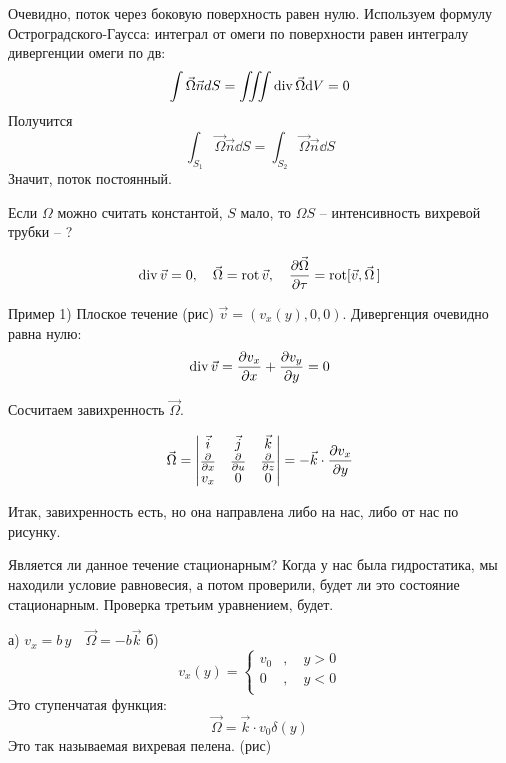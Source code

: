 Очевидно, поток через боковую поверхность равен нулю. Используем формулу Остроградского-Гаусса: интеграл от омеги по поверхности равен интегралу дивергенции омеги по дв:
\begin{equation}
	\int \vec \Omega \vec{n} dS=\iiint \operatorname{div}\vec \Omega \dd V=0
\end{equation}
Получится
\begin{equation}
	\int_{S_1} \vec \Omega \vec{n} \dd S=\int_{S_2} \vec \Omega \vec{n} \dd S
\end{equation}
Значит, поток постоянный.

Если $\Omega$ можно считать константой, $S$ мало, то $\Omega S$ -- интенсивность вихревой трубки -- ?

\begin{equation}
	\operatorname{div} \vec{v}=0, \quad
	\vec \Omega=\operatorname{rot}\vec{v}, \quad
	\pdv{\vec \Omega}{\tau}=\operatorname{rot}[\vec{v},\vec{\Omega}\,]
\end{equation}

Пример 1) Плоское течение (рис) $\vec{v}=(v_x(y),0,0)$. Дивергенция очевидно равна нулю:
\begin{equation}
	\operatorname{div}\vec{v}=\pdv{v_x}{x}+\pdv{v_y}{y}=0
\end{equation}

Сосчитаем завихренность $\vec\Omega$.

\begin{equation}
	\vec{\Omega}=\mqty| %
		\vec{i}&\vec{j}&\vec{k}\\
		\pdv{x}&\pdv{u}&\pdv{z}\\
		v_x&0&0
	|=-\vec{k}\cdot\pdv{v_x}{y}
\end{equation}

Итак, завихренность есть, но она направлена либо на нас, либо от нас по рисунку.

Является ли данное течение стационарным? Когда у нас была гидростатика, мы находили условие равновесия, а потом проверили, будет ли это состояние стационарным. Проверка третьим уравнением, будет.

а) $v_x=b\, y \quad \vec{\Omega}=-b\vec{k}$
б)
\begin{equation}
	v_x(y)=\left\{
	\begin{aligned}
		v_0&, \quad y>0\\
		0&, \quad y<0\\
	\end{aligned}
	\right.
\end{equation}
Это ступенчатая функция:
\begin{equation}
	\vec{\Omega}=\vec{k}\cdot v_0\delta(y)
\end{equation}
Это так называемая вихревая пелена. (рис)

